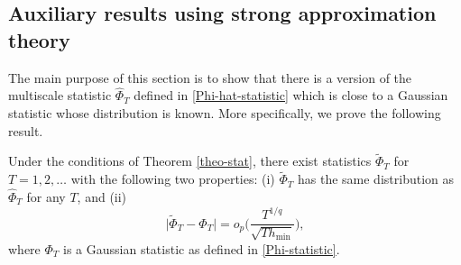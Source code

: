 \documentclass[a4paper,12pt]{article}
\numberwithin{equation}{section}
\begin{document}
\subsection*{Auxiliary results using strong approximation theory}


The main purpose of this section is to show that there is a version of the multiscale statistic $\widehat{\Phi}_T$ defined in \eqref{Phi-hat-statistic} which is close to a Gaussian statistic whose distribution is known. More specifically, we prove the following result. 
%
%
\begin{propA}\label{propA-strong-approx}
Under the conditions of Theorem \ref{theo-stat}, there exist statistics $\widetilde{\Phi}_T$ for $T = 1,2,\ldots$ with the following two properties: (i) $\widetilde{\Phi}_T$ has the same distribution as $\widehat{\Phi}_T$ for any $T$, and (ii)
\[ \big| \widetilde{\Phi}_T - \Phi_T \big| = o_p \Big( \frac{T^{1/q}}{\sqrt{T h_{\min}}} \Big), \]
where $\Phi_T$ is a Gaussian statistic as defined in \eqref{Phi-statistic}. 
\end{propA}
%
%
\end{document}

